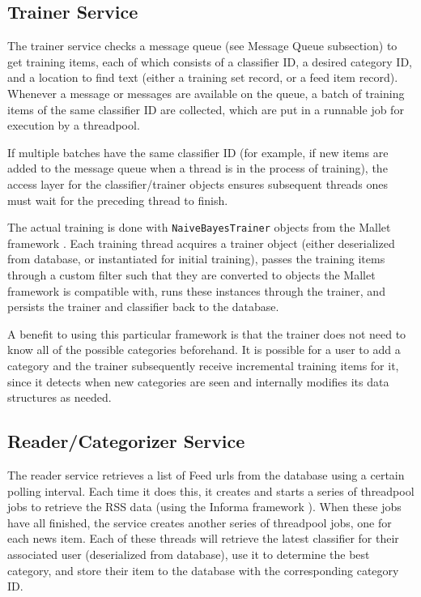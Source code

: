\documentclass[letterpaper]{article}
\begin{document}
\subsection{Trainer Service}
The trainer service checks a message queue (see Message Queue subsection) to get training items, each of which consists of a classifier ID, a desired category ID, and a location to find text (either a training set record, or a feed item record).
Whenever a message or messages are available on the queue, a batch of training items of the same classifier ID are collected, which are put in a runnable job for execution by a threadpool.

If multiple batches have the same classifier ID (for example, if new items are added to the message queue when a thread is in the process of training), the access layer for the classifier/trainer objects ensures subsequent threads ones must wait for the preceding thread to finish.

The actual training is done with \texttt{NaiveBayesTrainer} objects from the Mallet framework \cite{McCallumMALLET}.
Each training thread acquires a trainer object (either deserialized from database, or instantiated for initial training),
passes the training items through a custom filter such that they are converted to objects the Mallet framework is compatible with,
runs these instances through the trainer,
and persists the trainer and classifier back to the database.

A benefit to using this particular framework is that the trainer does not need to know all of the possible categories beforehand. It is possible for a user to add a category and the trainer subsequently receive incremental training items for it, since it detects when new categories are seen and internally modifies its data structures as needed.

\subsection{Reader/Categorizer Service}
The reader service retrieves a list of Feed urls from the database using a certain polling interval. Each time it does this, it creates and starts a series of threadpool jobs to retrieve the RSS data (using the Informa framework \cite{Informa}). When these jobs have all finished, the service creates another series of threadpool jobs, one for each news item. Each of these threads will retrieve the latest classifier for their associated user (deserialized from database), use it to determine the best category, and store their item to the database with the corresponding category ID.
\end{document}
